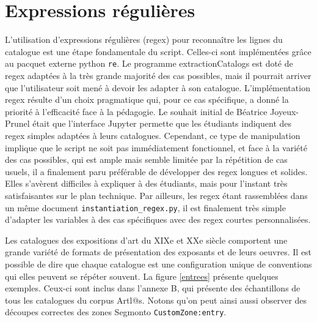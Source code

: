 \documentclass[a4paper,12pt,twoside]{book}
\begin{document}
\section{Expressions régulières}

L'utilisation d'expressions régulières (regex) pour reconnaître les lignes du catalogue est une étape fondamentale du script. Celles-ci sont implémentées grâce au pacquet externe python \texttt{re}. Le programme extractionCatalogs est doté de regex adaptées à la très grande majorité des cas possibles, mais il pourrait arriver que l'utilisateur soit mené à devoir les adapter à son catalogue. L'implémentation regex résulte d'un choix pragmatique qui, pour ce cas spécifique, a donné la priorité à l'efficacité face à la pédagogie. Le souhait initial de Béatrice Joyeux-Prunel était que l'interface Jupyter permette que les étudiants indiquent des regex simples adaptées à leurs catalogues. Cependant, ce type de manipulation implique que le script ne soit pas immédiatement fonctionnel, et face à la variété des cas possibles, qui est ample mais semble limitée par la répétition de cas usuels, il a finalement paru préférable de développer des regex longues et solides. Elles s'avèrent difficiles à expliquer à des étudiants, mais pour l'instant très satisfaisantes sur le plan technique. Par ailleurs, les regex étant rassemblées dans un même document \texttt{instantiation\_regex.py}, il est finalement très simple d'adapter les variables à des cas spécifiques avec des regex courtes personnalisées. 

Les catalogues des expositions d'art du XIXe et XXe siècle comportent une grande variété de formats de présentation des exposants et de leurs oeuvres. Il est possible de dire que chaque catalogue est une configuration unique de conventions qui elles peuvent se répéter souvent. La figure \ref{entrees} présente quelques exemples. Ceux-ci sont inclus dans l'annexe B, qui présente des échantillons de tous les catalogues du corpus Artl@s. Notons qu'on peut ainsi aussi observer des découpes correctes des zones Segmonto \texttt{CustomZone:entry}. 
\end{document}
